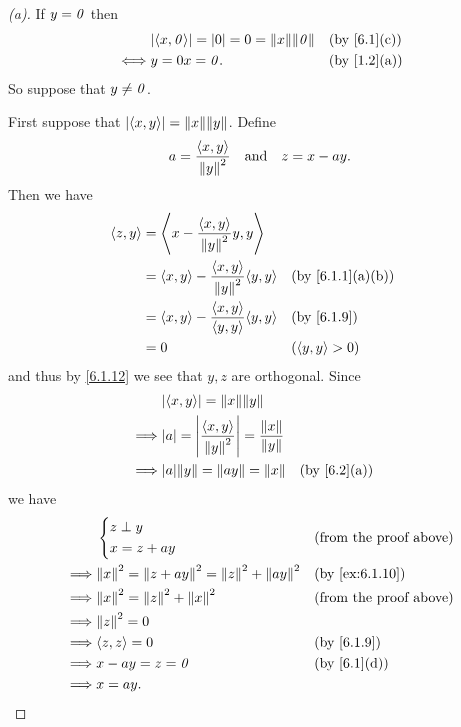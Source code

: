 \begin{proof}[(a)]
  If \(y = \mathit{0}\) then
  \begin{align*}
         & \abs{\inn{x, \zv}} = \abs{0} = 0 = \norm{x} \norm{\zv} &  & \by{6.1}[c] \\
    \iff & y = 0x = \zv.                                          &  & \by{1.2}[a]
  \end{align*}
  So suppose that \(y \neq \mathit{0}\).

  First suppose that \(\abs{\inn{x, y}} = \norm{x} \norm{y}\).
  Define
  \[
    a = \frac{\left\langle x, y\right\rangle}{\left\lVert y\right\rVert^2} \quad \text{and} \quad z = x - ay.
  \]
  Then we have
  \begin{align*}
    \inn{z, y} & = \inn{x - \frac{\inn{x, y}}{\norm{y}^2} y, y}                                \\
               & = \inn{x, y} - \frac{\inn{x, y}}{\norm{y}^2} \inn{y, y} &  & \by{6.1.1}[a,b]  \\
               & = \inn{x, y} - \frac{\inn{x, y}}{\inn{y, y}} \inn{y, y} &  & \by{6.1.9}       \\
               & = 0                                                     &  & (\inn{y, y} > 0)
  \end{align*}
  and thus by \cref{6.1.12} we see that \(y, z\) are orthogonal.
  Since
  \begin{align*}
             & \abs{\inn{x, y}} = \norm{x} \norm{y}                                                       \\
    \implies & \abs{a} = \abs{\frac{\inn{x, y}}{\norm{y}^2}} = \frac{\norm{x}}{\norm{y}}                  \\
    \implies & \abs{a} \norm{y} = \norm{ay} = \norm{x}                                   &  & \by{6.2}[a] \\
  \end{align*}
  we have
  \begin{align*}
             & \begin{dcases}
                 z \perp y \\
                 x = z + ay
               \end{dcases}                                          &  & \text{(from the proof above)}   \\
    \implies & \norm{x}^2 = \norm{z + ay}^2 = \norm{z}^2 + \norm{ay}^2 &  & \by{ex:6.1.10}                \\
    \implies & \norm{x}^2 = \norm{z}^2 + \norm{x}^2                    &  & \text{(from the proof above)} \\
    \implies & \norm{z}^2 = 0                                                                             \\
    \implies & \inn{z, z} = 0                                          &  & \by{6.1.9}                    \\
    \implies & x - ay = z = \zv                                        &  & \by{6.1}[d]                   \\
    \implies & x = ay.
  \end{align*}


\end{proof}
